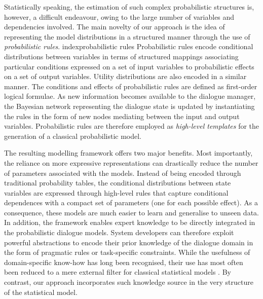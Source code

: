 Statistically speaking, the estimation of such complex probabilistic structures is, however, a difficult endeavour, owing to the large number of variables and dependencies involved. The main novelty of our approach is the idea of representing the model distributions in a structured manner through the use of \textit{probabilistic rules}. index{probabilistic rules} Probabilistic rules encode conditional distributions between variables in terms of structured mappings associating particular conditions expressed on a set of input variables to probabilistic effects on a set of output variables.  Utility distributions are also encoded in a similar manner. The conditions and effects of probabilistic rules are defined as first-order logical formulae. As new information becomes available to the dialogue manager, the Bayesian network representing the dialogue state is updated by instantiating the rules in the form of new nodes mediating between the input and output variables. Probabilistic rules are therefore employed as \textit{high-level templates} for the generation of a classical probabilistic model.  

The resulting modelling framework offers two major benefits. Most importantly, the reliance on more expressive representations can drastically reduce the number of parameters associated with the models.  Instead of being encoded through traditional probability tables, the conditional distributions between state variables are expressed through high-level rules that capture conditional dependences with a compact set of parameters (one for each possible effect). As a consequence, these models are much easier to learn and generalise to unseen data.  In addition, the framework enables expert knowledge to be directly integrated in the probabilistic dialogue models. System developers can therefore exploit powerful abstractions to encode their prior knowledge of the dialogue domain in the form of pragmatic rules or task-specific constraints.    
While the usefulness of domain-specific know-how has long been recognised, their use has most often been reduced to a mere external filter for classical statistical models \citep{heeman2007,williams2008}. By contrast, our approach incorporates such knowledge source in the very structure of the statistical model. 

